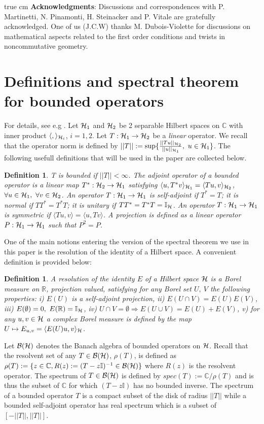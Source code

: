 \documentclass[a4paper,11pt,twoside]{article}
\numberwithin{equation}{section}
\newcommand\bbone{{ \mathbb{I}}}
\newtheorem{definition}[Theorem]{Definition}
\theoremstyle{nonumberplain}
\newcounter{and}
\begin{document}
 true cm
{\bf{Acknowledgments}}: Discussions and correspondences with P. Martinetti, N. Pinamonti, H. Steinacker and P. Vitale are gratefully acknowledged. One of us (J.C.W) thanks M. Dubois-Violette for discussions on mathematical aspects related to the first order conditions and twists in noncommutative geometry.

\setcounter{section}{0}
\appendix
\section{Definitions and spectral theorem for bounded operators}\label{appendix1}
For details, see e.g \cite{orthop-1}. Let ${\cal{H}}_1$ and ${\cal{H}}_2$ be 2 separable Hilbert spaces on $\mathbb{C}$ with inner product $\langle, \rangle_{{\cal{H}}_i}$, $i=1,2$. Let $T:{\cal{H}}_1\to{\cal{H}}_2$ be a {\it{linear}} operator. We recall that the operator norm is defined by $||T||:=\sup\{\frac{||Tu||_{{\cal{H}}_2}}{||u||_{{\cal{H}}_1}},\ u\in{\cal{H}}_1 \}$. The following usefull definitions that will be used in the paper are collected below.
\begin{definition}
T is bounded if $||T||<\infty$. The adjoint operator of a bounded operator is a linear map $T^*:{\cal{H}}_2\to{\cal{H}}_1$ satisfying $\langle u, T^*v\rangle_{{\cal{H}}_1}=\langle Tu,v \rangle_{{\cal{H}}_2}$, $\forall u\in{\cal{H}}_1,\ \forall v\in{\cal{H}}_2$. An operator $T:{\cal{H}}_1\to{\cal{H}}_1$ is 
self-adjoint if $T^*=T$; it is normal if $TT^*=T^*T$; it is unitary if $TT^*=T^*T=\bbone_{\cal{H}}$. An operator $T:{\cal{H}}_1\to{\cal{H}}_1$ is symmetric if $\langle Tu,v \rangle=\langle u,Tv\rangle$. A projection is defined as a linear operator $P:{\cal{H}}_1\to{\cal{H}}_1$ such that $P^2=P$.
\end{definition}
One of the main notions entering the version of the spectral theorem we use in this paper is the resolution of the identity of a Hilbert space. A convenient definition is provided below:
\begin{definition}\label{resolution}
A resolution of the identity $E$ of a Hilbert space ${\cal{H}}$ is a Borel measure on $\mathbb{R}$, projection valued, satisfying for any Borel set $U,\ V$ the following properties: i) $E(U)$ is a self-adjoint projection, ii) $E(U\cap V)=E(U)E(V)$, iii) $E(\emptyset)=0,\ E(\mathbb{R})=\bbone_{{\cal{H}}}$, iv) $U\cap V=\emptyset\Rightarrow E(U\cup V)=E(U)+E(V)$, v) for any $u,v\in\cal{H}$ a complex Borel measure is defined by the map $U\mapsto E_{u,v}=\langle E(U)u,v \rangle_{\cal{H}}$.
\end{definition}
Let ${\cal{B}}({\cal{H}})$ denotes the Banach algebra of bounded operators on ${\cal{H}}$. Recall that the resolvent set of any $T\in{\cal{B}}({\cal{H}})$, $\rho(T)$, is defined as $\rho(T):=\{z\in\mathbb{C}, R(z):=(T-z\bbone)^{-1}\in{\cal{B}}({\cal{H}})  \}$ where $R(z)$ is the resolvent operator. The spectrum of $T\in{\cal{B}}({\cal{H}})$ is defined by $spec(T):=\mathbb{C}/\rho(T)$ and is thus the subset of $\mathbb{C}$ for which $(T-z\bbone)$ has no bounded inverse. The spectrum of a bounded operator $T$ is a compact subset of the disk of radius $||T||$ while a bounded self-adjoint operator has real spectrum which is a subset of 
$[-||T||,||T||]$.\par
\end{document}
